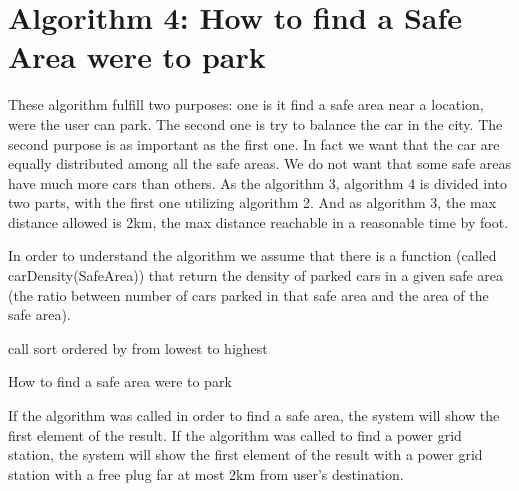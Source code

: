 \section{Algorithm 4: How to find a Safe Area were to park}
These algorithm fulfill two purposes: one is it find a safe area near a location, were the user can park. The second one is try to balance the car in the city. The second purpose is as important as the first one. In fact we want that the car are equally distributed among all the safe areas. We do not want that some safe areas have much more cars than others.
As the algorithm 3, algorithm 4 is divided into two parts, with the first one utilizing algorithm 2. And as algorithm 3, the max distance allowed is 2km, the max distance reachable in a reasonable time by foot.

In order to understand the algorithm we assume that there is a function (called carDensity(SafeArea)) that return the density of parked cars in a given safe area (the ratio between number of cars parked in that safe area and the area of the safe area).

\BlankLine

\begin{algorithm}[H]


	\BlankLine
	
call \;
sort \SAS ordered by \cd{\SA} from lowest to highest\;
\Return \Res \;
\caption{How to find a safe area were to park}
\end{algorithm}
\BlankLine
\BlankLine
\BlankLine
If the algorithm was called in order to find a safe area, the system will show the first element of the result. If the algorithm was called to find a power grid station, the system will show the first element of the result with a power grid station with a free plug far at most 2km from user's destination.